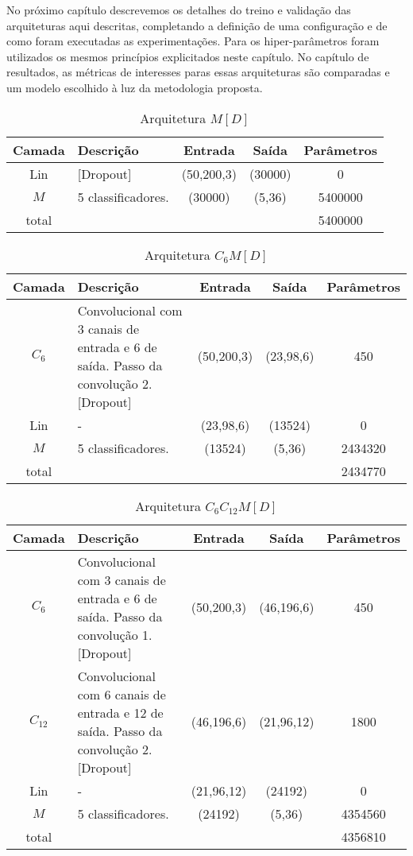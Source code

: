 No próximo capítulo descrevemos os detalhes do treino e validação das arquiteturas aqui descritas, completando a definição de uma configuração e de como foram executadas as experimentações. Para os hiper-parâmetros foram utilizados os mesmos princípios explicitados neste capítulo. No capítulo de resultados, as métricas de interesses paras essas arquiteturas são comparadas e um modelo escolhido à luz da metodologia proposta.

\noindent
\begin{table}[!p]
\begin{center}
	\caption{Arquitetura $M[D]$}
	\label{tab_md}
\end{center}
\begin{tabularx}{\linewidth}{ |c|X|c|c|c| }
	\hline
	Camada & Descrição & Entrada & Saída & Parâmetros \\ \hline\hline
	Lin & [Dropout] & (50,200,3) & (30000) & 0 \\ \hline
	$M$ & 5 classificadores. & (30000) & (5,36) & 5400000 \\ \hline
	total &  &  &  & 5400000 \\ \hline
\end{tabularx}
\end{table}
\noindent
\begin{table}[!p]
	\begin{center}
		\caption{Arquitetura $C_6M[D]$}
	\end{center}
\begin{tabularx}{\linewidth}{ |c|X|c|c|c| }
	\hline
	Camada & Descrição & Entrada & Saída & Parâmetros \\ \hline \hline
	$C_{6}$ & Convolucional com 3 canais de entrada e 6 de saída. Passo da convolução 2.  [Dropout] & (50,200,3) & (23,98,6) & 450 \\ \hline
	Lin & - & (23,98,6) & (13524) & 0 \\ \hline
	$M$ & 5 classificadores. & (13524) & (5,36) & 2434320 \\ \hline
	total &  &  &  & 2434770 \\ \hline
\end{tabularx}
\end{table}
\noindent
\begin{table}[!p]
\begin{center}
	\caption{Arquitetura $C_6C_{12}M[D]$}
\end{center}
\begin{tabularx}{\linewidth}{ |c|X|c|c|c| }
	\hline
	Camada & Descrição & Entrada & Saída & Parâmetros \\ \hline \hline
	$C_{6}$ & Convolucional com 3 canais de entrada e 6 de saída. Passo da convolução 1. [Dropout]& (50,200,3) & (46,196,6) & 450 \\ \hline
	$C_{12}$ & Convolucional com 6 canais de entrada e 12 de saída. Passo da convolução 2.  [Dropout] & (46,196,6) & (21,96,12) & 1800 \\ \hline
	Lin & - & (21,96,12) & (24192) & 0 \\ \hline
	$M$ & 5 classificadores. & (24192) & (5,36) & 4354560 \\ \hline
	total &  &  &  & 4356810 \\ \hline
\end{tabularx}
\end{table}
